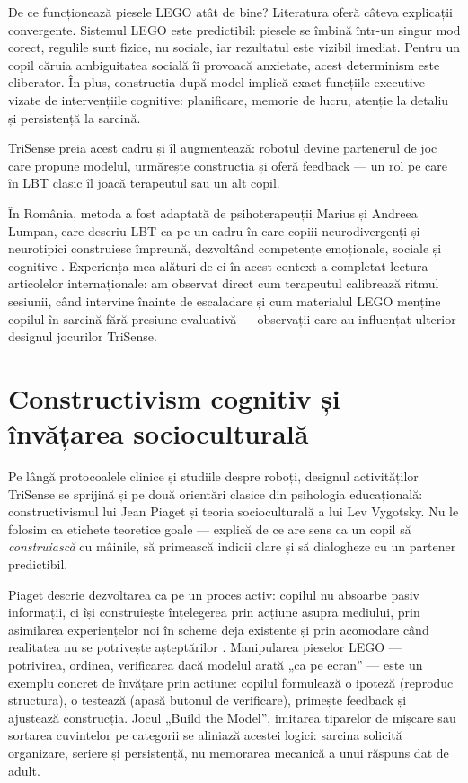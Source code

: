 De ce funcționează piesele LEGO atât de bine? Literatura oferă câteva explicații convergente. Sistemul LEGO este predictibil: piesele se îmbină într-un singur mod corect, regulile sunt fizice, nu sociale, iar rezultatul este vizibil imediat. Pentru un copil căruia ambiguitatea socială îi provoacă anxietate, acest determinism este eliberator. În plus, construcția după model implică exact funcțiile executive vizate de intervențiile cognitive: planificare, memorie de lucru, atenție la detaliu și persistență la sarcină.

TriSense preia acest cadru și îl augmentează: robotul devine partenerul de joc care propune modelul, urmărește construcția și oferă feedback — un rol pe care în LBT clasic îl joacă terapeutul sau un alt copil.

În România, metoda a fost adaptată de psihoterapeuții Marius și Andreea Lumpan, care descriu LBT ca pe un cadru în care copiii neurodivergenți și neurotipici construiesc împreună, dezvoltând competențe emoționale, sociale și cognitive \cite{lumpanagerpres2025}. Experiența mea alături de ei în acest context a completat lectura articolelor internaționale: am observat direct cum terapeutul calibrează ritmul sesiunii, când intervine înainte de escaladare și cum materialul LEGO menține copilul în sarcină fără presiune evaluativă — observații care au influențat ulterior designul jocurilor TriSense.

\section{Constructivism cognitiv și învățarea socioculturală}

Pe lângă protocoalele clinice și studiile despre roboți, designul activităților TriSense se sprijină și pe două orientări clasice din psihologia educațională: constructivismul lui Jean Piaget și teoria socioculturală a lui Lev Vygotsky. Nu le folosim ca etichete teoretice goale — explică de ce are sens ca un copil să \emph{construiască} cu mâinile, să primească indicii clare și să dialogheze cu un partener predictibil.

Piaget descrie dezvoltarea ca pe un proces activ: copilul nu absoarbe pasiv informații, ci își construiește înțelegerea prin acțiune asupra mediului, prin asimilarea experiențelor noi în scheme deja existente și prin acomodare când realitatea nu se potrivește așteptărilor \cite{piaget1969}. Manipularea pieselor LEGO — potrivirea, ordinea, verificarea dacă modelul arată „ca pe ecran” — este un exemplu concret de învățare prin acțiune: copilul formulează o ipoteză (reproduc structura), o testează (apasă butonul de verificare), primește feedback și ajustează construcția. Jocul „Build the Model”, imitarea tiparelor de mișcare sau sortarea cuvintelor pe categorii se aliniază acestei logici: sarcina solicită organizare, seriere și persistență, nu memorarea mecanică a unui răspuns dat de adult.

